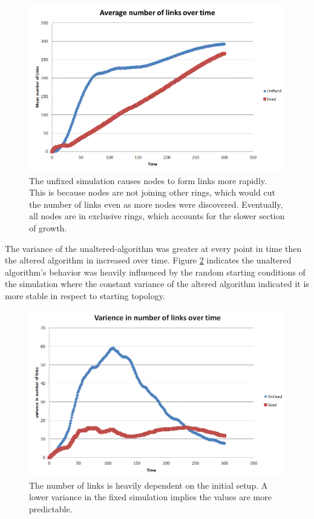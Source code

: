 \documentclass[12pt]{ieeetran} %
\begin{document}
\begin{figure}
	\includegraphics[width=\linewidth]{chart1}
	\caption{The unfixed simulation causes nodes to form links more rapidly.  This is because nodes are not joining other rings, which would cut the number of links even as more nodes were discovered.  Eventually, all nodes are in exclusive rings, which accounts for the slower section of growth.}
	\label{chart1}
\end{figure}

The variance of the unaltered-algorithm was greater at every point in time then the altered algorithm in increased over time. Figure \ref{chart2} indicates the unaltered algorithm's behavior was heavily influenced by the random starting conditions of the simulation where the constant variance of the altered algorithm indicated it is more stable in respect to starting topology. 



\begin{figure}
	\includegraphics[width=\linewidth]{chart2}
	\caption{The number of links is heavily dependent on the initial setup.  A lower variance in the fixed simulation implies the values are more predictable.}
	\label{chart2}
\end{figure}
\end{document}
